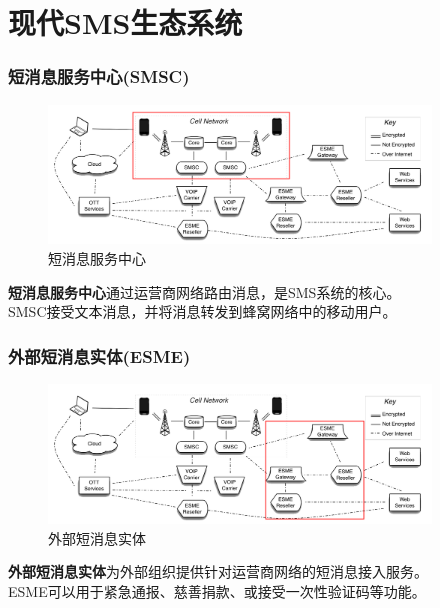 \documentclass[10pt,aspectratio=43,mathserif]{beamer}
\begin{document}
\section[系统]{现代SMS生态系统}

		\begin{frame}
		  \frametitle{\textbf{短消息服务中心(SMSC)}}
            \begin{figure}[!t]
            \centering
            \includegraphics[width=4in]{figures/figure1.png}
            \caption{短消息服务中心}
            \label{figure1_SMSC}
            \end{figure}
            \textbf{短消息服务中心}通过运营商网络路由消息，是SMS系统的核心。\\
            SMSC接受文本消息，并将消息转发到蜂窝网络中的移动用户。
		\end{frame}

		\begin{frame}
		  \frametitle{\textbf{外部短消息实体(ESME)}}
            \begin{figure}[!t]
            \centering
            \includegraphics[width=4in]{figures/figure2.png}
            \caption{外部短消息实体}
            \label{figure2_ESME}
            \end{figure}
            \textbf{外部短消息实体}为外部组织提供针对运营商网络的短消息接入服务。\\
            ESME可以用于紧急通报、慈善捐款、或接受一次性验证码等功能。
		\end{frame}
\end{document}
